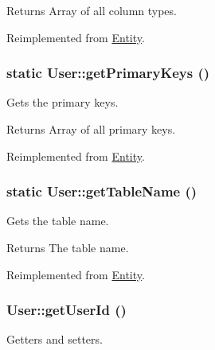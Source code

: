 \begin{DoxyReturn}{Returns}
Array of all column types. 
\end{DoxyReturn}


Reimplemented from \hyperlink{classEntity_ad69437219c10955803707fbf6ac458e7}{Entity}.

\hypertarget{classUser_a14fab2319493a4940e1975b72386e80a}{
\subsubsection[{getPrimaryKeys}]{\setlength{\rightskip}{0pt plus 5cm}static User::getPrimaryKeys ()}}
\label{classUser_a14fab2319493a4940e1975b72386e80a}
Gets the primary keys.

\begin{DoxyReturn}{Returns}
Array of all primary keys. 
\end{DoxyReturn}


Reimplemented from \hyperlink{classEntity_a61bbfbb4058427174e002a09ddc77c41}{Entity}.

\hypertarget{classUser_a3641dffbe0835b6cc56e875b21cba4b1}{
\subsubsection[{getTableName}]{\setlength{\rightskip}{0pt plus 5cm}static User::getTableName ()}}
\label{classUser_a3641dffbe0835b6cc56e875b21cba4b1}
Gets the table name.

\begin{DoxyReturn}{Returns}
The table name. 
\end{DoxyReturn}


Reimplemented from \hyperlink{classEntity_a8305fd94740ac62cbafb9de76567ce37}{Entity}.

\hypertarget{classUser_a842606f37f63f53df58430db6e344b0f}{
\subsubsection[{getUserId}]{\setlength{\rightskip}{0pt plus 5cm}User::getUserId ()}}
\label{classUser_a842606f37f63f53df58430db6e344b0f}
Getters and setters. 

